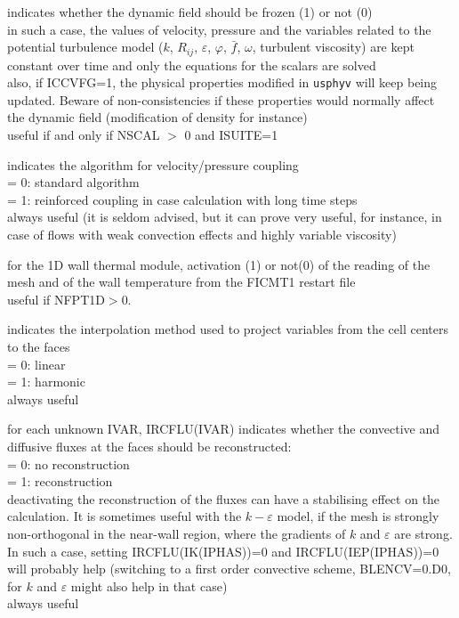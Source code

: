 {indicates whether the dynamic field should be frozen (1) or not (0)\\
in such a case, the values of velocity,
pressure and the variables related to the potential turbulence model
($k$, $R_{ij}$, $\varepsilon$, $\varphi$, $\bar{f}$, $\omega$, turbulent viscosity) are kept
constant over time and only the equations for the scalars are solved\\
also, if ICCVFG=1, the physical properties modified in \texttt{usphyv} will keep
being updated. Beware of non-consistencies if these properties would normally
affect the dynamic field (modification of density for instance)\\
useful if and only if NSCAL $>$ 0 and ISUITE=1}

{indicates the algorithm for velocity/pressure coupling\\
\hspace*{1.3cm}= 0: standard algorithm\\
\hspace*{1.3cm}= 1: reinforced coupling in case calculation with long
time steps\\
always useful (it is seldom advised, but it can prove very useful, for instance,
in case of flows with weak convection effects and highly variable viscosity)}

{for the  1D wall thermal module, activation (1) or not(0) of the reading
of the mesh and of the wall temperature from the FICMT1 restart file\\
useful if NFPT1D$>$0.}

{indicates the interpolation method used to project variables from the cell
centers to the faces\\
\hspace*{1.3cm}= 0: linear\\
\hspace*{1.3cm}= 1: harmonic\\
always useful}

{for each unknown IVAR, IRCFLU(IVAR) indicates whether the convective
and diffusive fluxes at the faces should be reconstructed: \\
\hspace*{1.3cm}= 0: no reconstruction\\
\hspace*{1.3cm}= 1: reconstruction\\
deactivating the reconstruction of the fluxes can have a stabilising effect on
the calculation. It is sometimes useful with the $k-\varepsilon$ model, if the
mesh is strongly non-orthogonal in the near-wall region, where the gradients of
$k$ and $\varepsilon$ are strong. In such a case, setting IRCFLU(IK(IPHAS))=0
and IRCFLU(IEP(IPHAS))=0 will probably help (switching to a first order
convective scheme, BLENCV=0.D0, for $k$ and $\varepsilon$ might also help in
that case)\\
always useful}

